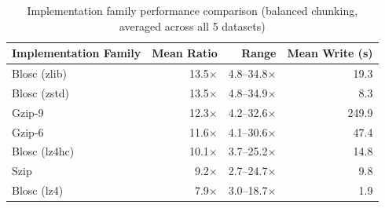 \begin{table}[h]
\centering
\caption{Implementation family performance comparison (balanced chunking, averaged across all 5 datasets)}
\label{tab:algorithm_families}
\begin{tabular}{lrrr}
\hline
Implementation Family & Mean Ratio & Range & Mean Write (s) \\
\hline
Blosc (zlib) & 13.5$\times$ & 4.8--34.8$\times$ & 19.3 \\
Blosc (zstd) & 13.5$\times$ & 4.8--34.9$\times$ & 8.3 \\
Gzip-9 & 12.3$\times$ & 4.2--32.6$\times$ & 249.9 \\
Gzip-6 & 11.6$\times$ & 4.1--30.6$\times$ & 47.4 \\
Blosc (lz4hc) & 10.1$\times$ & 3.7--25.2$\times$ & 14.8 \\
Szip & 9.2$\times$ & 2.7--24.7$\times$ & 9.8 \\
Blosc (lz4) & 7.9$\times$ & 3.0--18.7$\times$ & 1.9 \\
\hline
\end{tabular}
\end{table}
